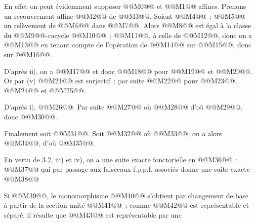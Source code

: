 

En
effet on peut évidemment supposer @@M0@@ et @@M1@@ affines. Prenons un recouvrement affine @@M2@@ de @@M3@@. Soient @@M4@@~; @@M5@@ un relèvement de @@M6@@ dans @@M7@@. Alors @@M8@@ est égal à la classe du @@M9@@-cocycle @@M10@@~; @@M11@@, à celle de @@M12@@, donc on a
@@M13@@
en tenant compte de l'opération de @@M14@@ sur @@M15@@, donc sur @@M16@@.

D'après ii), on a @@M17@@ et donc @@M18@@ pour
@@M19@@ et
@@M20@@. Or par (v) @@M21@@ est surjectif~; par suite @@M22@@ pour
@@M23@@, @@M24@@ et
@@M25@@.

D'après i),
@@M26@@. Par suite @@M27@@ où @@M28@@ d'où @@M29@@, donc @@M30@@.

Finalement soit @@M31@@. Soit @@M32@@ où
@@M33@@; on a alors @@M34@@, d'où @@M35@@.

En vertu de 3.2, iii) et iv), on a une suite exacte fonctorielle en @@M36@@~:
@@M37@@
qui par passage aux faisceaux f.p.p.f. associés donne une suite exacte
@@M38@@

Si @@M39@@, le monomorphisme @@M40@@ s'obtient par changement de base à partir de la section unité @@M41@@~; comme @@M42@@ est représentable et séparé, il résulte que @@M43@@ est représentable par une
